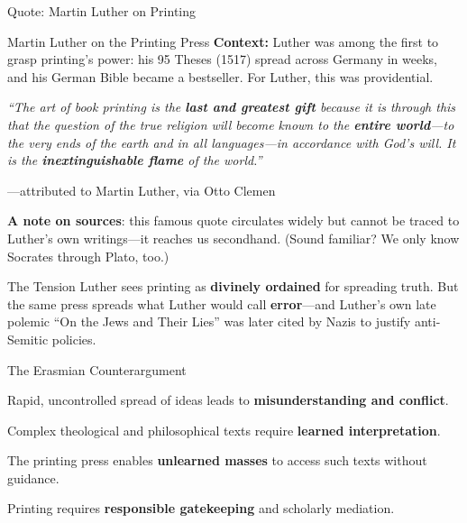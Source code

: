 \documentclass[aspectratio=169,11pt]{beamer}
\begin{document}
\begin{frame}{Quote: Martin Luther on Printing}
\begin{exampleblock}{\faQuoteLeft\hspace{0.5em}Martin Luther on the Printing Press}
\small
\textbf{Context:} Luther was among the first to grasp printing's power: his 95 Theses (1517) spread across Germany in weeks, and his German Bible became a bestseller. For Luther, this was providential.

\vspace{0.4em}
\textit{``The art of book printing is the \textbf{last and greatest gift} because it is through this that the question of the true religion will become known to the \textbf{entire world}---to the very ends of the earth and in all languages---in accordance with God's will. It is the \textbf{inextinguishable flame} of the world.''}

\vspace{0.2em}
\hfill---attributed to Martin Luther, via Otto Clemen

\vspace{0.2em}
{\scriptsize \textbf{A note on sources}: this famous quote circulates widely but cannot be traced to Luther's own writings---it reaches us secondhand. (Sound familiar? We only know Socrates through Plato, too.)}
\end{exampleblock}

\vspace{0.2em}
\begin{block}{\faLightbulb\hspace{0.5em}The Tension}
\small Luther sees printing as \textbf{divinely ordained} for spreading truth. But the same press spreads what Luther would call \textbf{error}---and Luther's own late polemic ``On the Jews and Their Lies'' was later cited by Nazis to justify anti-Semitic policies.
\end{block}
\end{frame}

\begin{frame}{The Erasmian Counterargument}
\begin{argument}
  \item Rapid, uncontrolled spread of ideas leads to \textbf{misunderstanding and conflict}.
  \item Complex theological and philosophical texts require \textbf{learned interpretation}.
  \item The printing press enables \textbf{unlearned masses} to access such texts without guidance.
  \item[\textbf{$\therefore$}] Printing requires \textbf{responsible gatekeeping} and scholarly mediation.
\end{argument}

\vspace{0.5em}
\end{frame}
\end{document}
